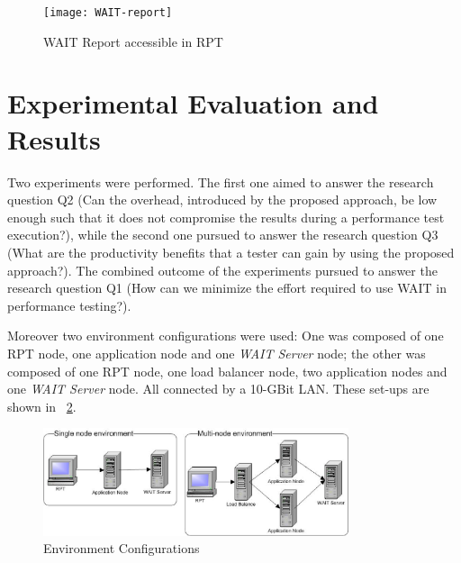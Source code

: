 \documentclass[runningheads,a4paper]{llncs}
\begin{document}
\begin{figure}[!h]
\centering
\texttt{[image: WAIT-report]}
\caption{WAIT Report accessible in RPT}
\label{fig_report}
\end{figure}

\vspace{5pt}
\section{Experimental Evaluation and Results}
\vspace{-5pt}

Two experiments were performed. The first one aimed to answer the
research question Q2 (Can the overhead, introduced by the proposed approach, be
low enough such that it does not compromise the results during a performance
test execution?), while the second one pursued to answer the research question Q3 (What are the
productivity benefits that a tester can gain by using the proposed approach?).
The combined outcome of the experiments pursued to answer the research question
Q1 (How can we minimize the effort required to use WAIT in performance testing?).

Moreover two environment configurations were used: One was composed of one RPT
node, one application node and one \emph{WAIT Server} node; the other was composed of
one RPT node, one load balancer node, two application nodes and one \emph{WAIT
Server} node. All connected by a 10-GBit LAN. These set-ups are shown in
\figurename ~\ref{fig_env}.

\begin{figure}[!h]
\centering
\includegraphics[totalheight=.18\textheight,width=0.8\textwidth]{Environments}
\caption{Environment Configurations}
\label{fig_env}
\end{figure}
\end{document}
